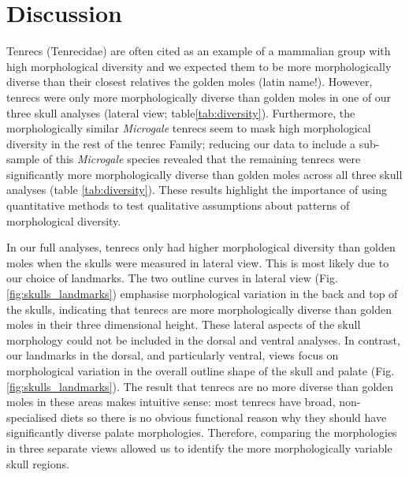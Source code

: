 \documentclass[12pt,a4paper]{article}
\begin{document}
\section{Discussion} 

	Tenrecs (Tenrecidae) are often cited as an example of a mammalian group with high morphological diversity \citep{Olson2013, Soarimalala2011, Eisenberg1969} and we expected them to be more morphologically diverse than their closest relatives the golden moles (latin name!). However, tenrecs were only more morphologically diverse than golden moles in one of our three skull analyses (lateral view; table\ref{tab:diversity}). Furthermore, the morphologically similar \textit{Microgale} tenrecs seem to mask high morphological diversity in the rest of the tenrec Family; reducing our data to include a sub-sample of this \textit{Microgale} species revealed that the remaining tenrecs were significantly more morphologically diverse than golden moles across all three skull analyses (table \ref{tab:diversity}). %
	These results highlight the importance of using quantitative methods to test qualitative assumptions about patterns of morphological diversity.
	
	In our full analyses, tenrecs only had higher morphological diversity than golden moles when the skulls were measured in lateral view. This is most likely due to our choice of landmarks. The two outline curves in lateral view (Fig. \ref{fig:skulls_landmarks}) emphasise morphological variation in the back and top of the skulls, indicating that tenrecs are more morphologically diverse than golden moles in their three dimensional height. %
	These lateral aspects of the skull morphology could not be included in the dorsal and ventral analyses. In contrast, our landmarks in the dorsal, and particularly ventral, views focus on morphological variation in the overall outline shape of the skull and palate (Fig. \ref{fig:skulls_landmarks}). The result that tenrecs are no more diverse than golden moles in these areas makes intuitive sense: most tenrecs have broad, non-specialised diets \citep{Olson2013} so there is no obvious functional reason why they should have significantly diverse palate morphologies.
	Therefore, comparing the morphologies in three separate views allowed us to identify the more morphologically variable skull regions. 
	
\end{document}
